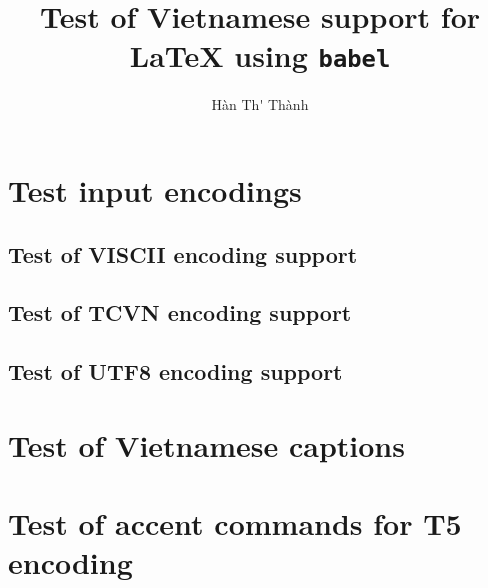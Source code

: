 \documentclass[openany]{book}
\begin{document}
\title{\bfseries Test of Vietnamese support for \LaTeX{} using \texttt{babel}}
\author{H\`an Th\'\ecircumflex{} Th\`anh}
\maketitle

\tableofcontents
\listoffigures

\chapter{Test input encodings}
\section{Test of VISCII encoding support}


\section{Test of TCVN encoding support}


\section{Test of UTF8 encoding support}



\clearpage
\appendix

\chapter{Test of Vietnamese captions}


\chapter{Test of accent commands for T5 encoding}

\end{document}
